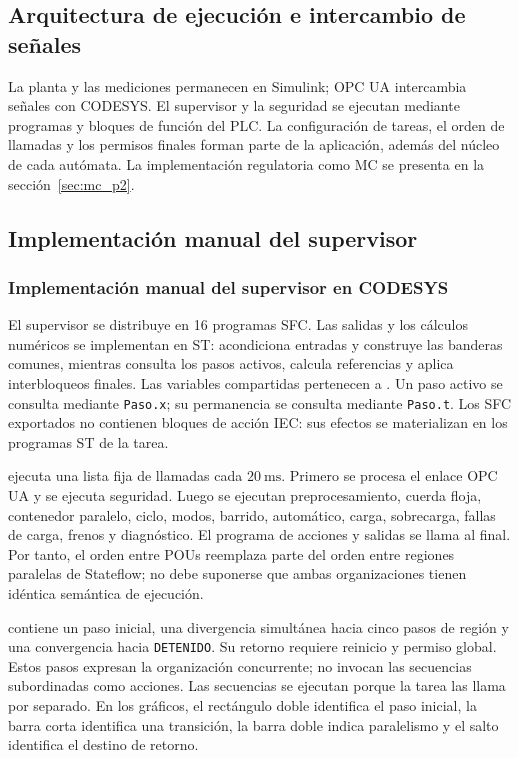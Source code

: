 \documentclass[a4paper,10pt,onecolumn,journal]{ieeeconf}
\numberwithin{equation}{section}
\begin{document}

\subsection{Arquitectura de ejecución e intercambio de señales}
La planta y las mediciones permanecen en Simulink; OPC UA intercambia señales con CODESYS. El supervisor y la seguridad se ejecutan mediante programas y bloques de función del PLC. La configuración de tareas, el orden de llamadas y los permisos finales forman parte de la aplicación, además del núcleo de cada autómata. La implementación regulatoria como MC se presenta en la sección~\ref{sec:mc_p2}.


\subsection{Implementación manual del supervisor}
\label{subsec:sup_manual_codesys}
\subsubsection{Implementación manual del supervisor en CODESYS}
El supervisor se distribuye en 16 programas SFC. Las salidas y los cálculos numéricos se implementan en ST:  acondiciona entradas y construye las banderas comunes, mientras  consulta los pasos activos, calcula referencias y aplica interbloqueos finales. Las variables compartidas pertenecen a . Un paso activo se consulta mediante \texttt{Paso.x}; su permanencia se consulta mediante \texttt{Paso.t}. Los SFC exportados no contienen bloques de acción IEC: sus efectos se materializan en los programas ST de la tarea.

 ejecuta una lista fija de llamadas cada $20~\mathrm{ms}$. Primero se procesa el enlace OPC UA y se ejecuta seguridad. Luego se ejecutan preprocesamiento, cuerda floja, contenedor paralelo, ciclo, modos, barrido, automático, carga, sobrecarga, fallas de carga, frenos y diagnóstico. El programa de acciones y salidas se llama al final. Por tanto, el orden entre POUs reemplaza parte del orden entre regiones paralelas de Stateflow; no debe suponerse que ambas organizaciones tienen idéntica semántica de ejecución.

 contiene un paso inicial, una divergencia simultánea hacia cinco pasos de región y una convergencia hacia \texttt{DETENIDO}. Su retorno requiere reinicio y permiso global. Estos pasos expresan la organización concurrente; no invocan las secuencias subordinadas como acciones. Las secuencias se ejecutan porque la tarea las llama por separado. En los gráficos, el rectángulo doble identifica el paso inicial, la barra corta identifica una transición, la barra doble indica paralelismo y el salto identifica el destino de retorno.
\end{document}
